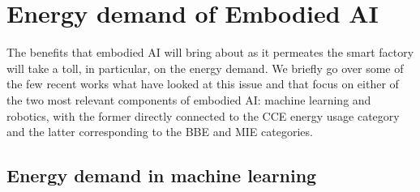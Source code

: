 \section{Energy demand of Embodied AI}
The benefits that embodied AI will bring about as it permeates the smart factory will take a toll, in particular, on the energy demand. We briefly go over some of the few recent works what have looked at this issue and that focus on either of the two most relevant components of embodied AI: machine learning and robotics, with the former directly connected to the CCE energy usage category and the latter corresponding to the BBE and MIE categories.

\subsection{Energy demand in machine learning}

